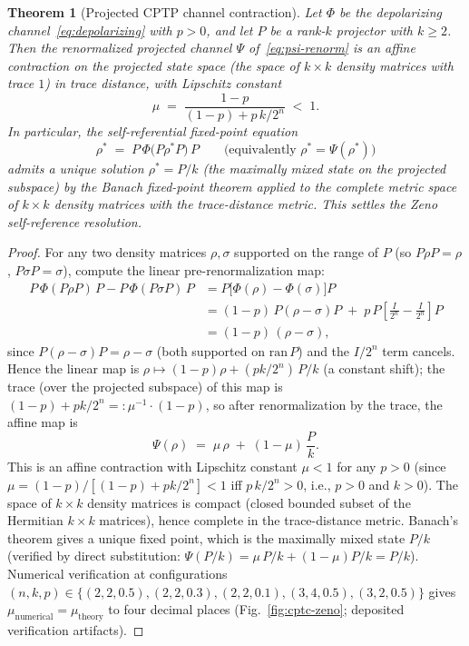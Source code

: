 \documentclass[11pt,a4paper]{article}
\theoremstyle{plain}
\newtheorem{theorem}{Theorem}[section]
\theoremstyle{definition}
\theoremstyle{remark}
\begin{document}
\begin{theorem}[Projected CPTP channel contraction]
\label{thm:zeno-contraction}
Let $\Phi$ be the depolarizing channel~\eqref{eq:depolarizing} with
$p>0$, and let $P$ be a rank-$k$ projector with $k\geq 2$. Then the
renormalized projected channel $\Psi$ of~\eqref{eq:psi-renorm} is an
affine contraction on the projected state space (the space of $k\times
k$ density matrices with trace $1$) in trace distance, with Lipschitz
constant
\begin{equation}\label{eq:mu-theory}
  \mu \;=\; \frac{1-p}{(1-p)+p\,k/2^{n}} \;<\; 1.
\end{equation}
In particular, the self-referential fixed-point equation
\begin{equation}\label{eq:zeno-fixed-eq}
  \rho^{*} \;=\; P\,\Phi\!\bigl(P\rho^{*}P\bigr)\,P
  \qquad\text{(equivalently } \rho^{*}=\Psi(\rho^{*})\text{)}
\end{equation}
admits a unique solution $\rho^{*}=P/k$ (the maximally mixed state on
the projected subspace) by the Banach fixed-point theorem applied to
the complete metric space of $k\times k$ density matrices with the
trace-distance metric. This settles the Zeno self-reference
resolution.
\end{theorem}

\begin{proof}
For any two density matrices $\rho,\sigma$ supported on the range of
$P$ (so $P\rho P=\rho$, $P\sigma P=\sigma$), compute the linear
pre-renormalization map:
\begin{align*}
P\,\Phi(P\rho P)\,P - P\,\Phi(P\sigma P)\,P
&= P\bigl[\Phi(\rho)-\Phi(\sigma)\bigr]P \\
&= (1-p)\,P(\rho-\sigma)P
   \;+\; p\,P\!\left[\tfrac{I}{2^{n}}-\tfrac{I}{2^{n}}\right]\!P \\
&= (1-p)\,(\rho-\sigma),
\end{align*}
since $P(\rho-\sigma)P=\rho-\sigma$ (both supported on $\mathrm{ran}\,P$)
and the $I/2^{n}$ term cancels. Hence the linear map is
$\rho\mapsto (1-p)\rho + (pk/2^{n})\,P/k$ (a constant shift); the
trace (over the projected subspace) of this map is
$(1-p)+pk/2^{n}=:\mu^{-1}\cdot(1-p)$, so after renormalization by
the trace, the affine map is
\begin{equation*}
\Psi(\rho) \;=\; \mu\,\rho \;+\; (1-\mu)\,\frac{P}{k}.
\end{equation*}
This is an affine contraction with Lipschitz constant $\mu<1$ for any
$p>0$ (since $\mu=(1-p)/[(1-p)+pk/2^{n}]<1$ iff $p\,k/2^{n}>0$, i.e.,
$p>0$ and $k>0$). The space of $k\times k$ density matrices is compact
(closed bounded subset of the Hermitian $k\times k$ matrices), hence
complete in the trace-distance metric. Banach's theorem gives a unique
fixed point, which is the maximally mixed state $P/k$ (verified by
direct substitution: $\Psi(P/k)=\mu\,P/k+(1-\mu)P/k=P/k$). Numerical
verification at configurations
$(n,k,p)\in\{(2,2,0.5),(2,2,0.3),(2,2,0.1),(3,4,0.5),(3,2,0.5)\}$
gives $\mu_{\mathrm{numerical}}=\mu_{\mathrm{theory}}$ to four decimal
places (Fig.~\ref{fig:cptc-zeno}; deposited verification
artifacts).
\end{proof}
\end{document}
